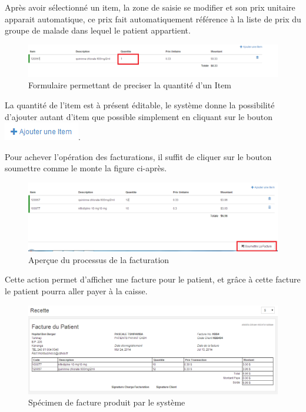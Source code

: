 \documentclass[12pt,a4paper]{report}
\begin{document}
Après avoir sélectionné un item, la zone de saisie se modifier et son prix unitaire apparait automatique, ce prix fait automatiquement référence à la liste de prix du groupe de malade dans lequel le patient appartient. 


\begin{figure}[h]
\begin{center}
\includegraphics[width=14cm]{pic/UpdateItem.png}
\end{center}
\caption{Formulaire permettant de preciser la quantité d'un Item}
\label{Formulaire permettant de preciser la quantité d'un Item}
\end{figure}


La quantité de l'item est à présent éditable, le système donne la possibilité d'ajouter autant d'item que possible simplement en cliquant sur le bouton 
\includegraphics[scale=0.7]{pic/PlusAddItem.png}.
 
Pour achever l'opération des facturations, il suffit de cliquer sur le bouton soumettre comme le monte la figure ci-après.

\begin{figure}[h]
\begin{center}
\includegraphics[width=14cm]{pic/InterfaceSoumettreFacture.png}
\end{center}
\caption{Aperçue du processus de la facturation}
\label{Aperçue du processus de la facturation}
\end{figure}

Cette action permet d'afficher une facture pour le patient, et grâce à cette facture le patient pourra aller payer à la caisse.


\begin{figure}[h]
\begin{center}
\includegraphics[width=14cm]{pic/InvoiceView.png}
\end{center}
\caption{Spécimen de facture produit par le système}
\label{Spécimen de facture produit par le système}
\end{figure}
\end{document}
